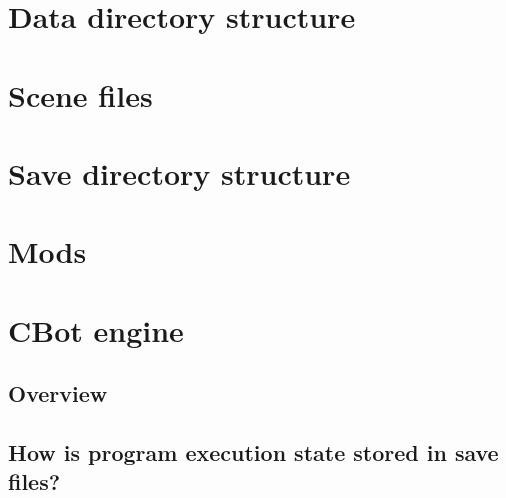 
\chapter{Data directory structure}



\chapter{Scene files}



\chapter{Save directory structure}



\chapter{Mods}



\chapter{CBot engine}


\section{Overview}


\section{How is program execution state stored in save files?}
